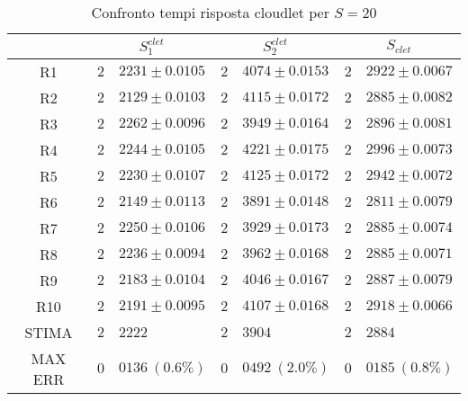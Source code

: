 \begin{table}[!h]
\begin{tabular}{c|r@{.}l|r@{.}l|r@{.}l}
& \multicolumn{2}{|c|}{$S_1^{clet}$}
& \multicolumn{2}{|c|}{$S_2^{clet}$}
& \multicolumn{2}{|c}{$S_{clet}$} 
\\          
\hline
R1      & $2$&$2231 \pm 0.0105$ & $2$&$4074 \pm 0.0153$ & $2$&$2922 \pm 0.0067$ \\
R2      & $2$&$2129 \pm 0.0103$ & $2$&$4115 \pm 0.0172$ & $2$&$2885 \pm 0.0082$ \\
R3      & $2$&$2262 \pm 0.0096$ & $2$&$3949 \pm 0.0164$ & $2$&$2896 \pm 0.0081$ \\
R4      & $2$&$2244 \pm 0.0105$ & $2$&$4221 \pm 0.0175$ & $2$&$2996 \pm 0.0073$ \\
R5      & $2$&$2230 \pm 0.0107$ & $2$&$4125 \pm 0.0172$ & $2$&$2942 \pm 0.0072$ \\
R6      & $2$&$2149 \pm 0.0113$ & $2$&$3891 \pm 0.0148$ & $2$&$2811 \pm 0.0079$ \\
R7      & $2$&$2250 \pm 0.0106$ & $2$&$3929 \pm 0.0173$ & $2$&$2885 \pm 0.0074$ \\
R8      & $2$&$2236 \pm 0.0094$ & $2$&$3962 \pm 0.0168$ & $2$&$2885 \pm 0.0071$ \\
R9      & $2$&$2183 \pm 0.0104$ & $2$&$4046 \pm 0.0167$ & $2$&$2887 \pm 0.0079$ \\
R10     & $2$&$2191 \pm 0.0095$ & $2$&$4107 \pm 0.0168$ & $2$&$2918 \pm 0.0066$ \\
STIMA   & $2$&$2222$            & $2$&$3904$            & $2$&$2884$            \\
MAX ERR & $0$&$0136 \ (0.6\%)$  & $0$&$0492 \ (2.0\%)$  & $0$&$0185 \ (0.8\%)$    
\end{tabular}
\centering
\caption{Confronto tempi risposta cloudlet per $S=20$}
\label{tab:20_sclet}
\end{table}
